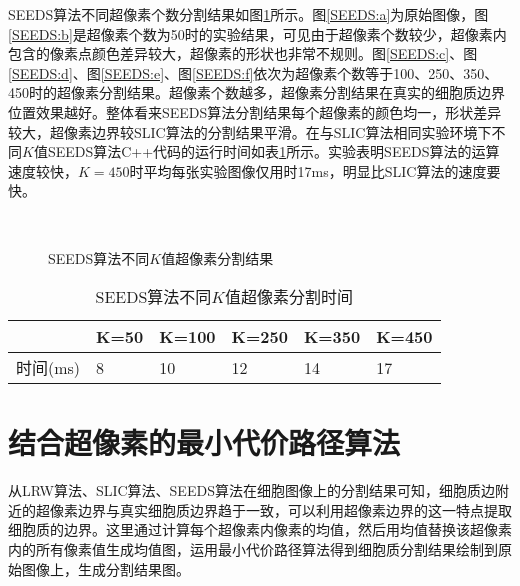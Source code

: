 \documentclass[nomlist,masters]{seuthesix}
\begin{document}
SEEDS算法不同超像素个数分割结果如图\ref{SEEDS}所示。图\ref{SEEDS:a}为原始图像，图\ref{SEEDS:b}是超像素个数为50时的实验结果，可见由于超像素个数较少，超像素内包含的像素点颜色差异较大，超像素的形状也非常不规则。图\ref{SEEDS:c}、图\ref{SEEDS:d}、图\ref{SEEDS:e}、图\ref{SEEDS:f}依次为超像素个数等于100、250、350、450时的超像素分割结果。超像素个数越多，超像素分割结果在真实的细胞质边界位置效果越好。整体看来SEEDS算法分割结果每个超像素的颜色均一，形状差异较大，超像素边界较SLIC算法的分割结果平滑。在与SLIC算法相同实验环境下不同$K$值SEEDS算法C++代码的运行时间如表\ref{SEEDStime}所示。实验表明SEEDS算法的运算速度较快，$K=450$时平均每张实验图像仅用时17ms，明显比SLIC算法的速度要快。
\begin{figure}[H]
\centering 
\hspace{0.01\textwidth}
\hspace{0.01\textwidth}
\vfill
\centering 
\hspace{0.01\textwidth}
\hspace{0.01\textwidth}
\caption{SEEDS算法不同$K$值超像素分割结果}
\label{SEEDS}
\end{figure}

\begin{table}[H]
\centering
\caption{SEEDS算法不同$K$值超像素分割时间\label{SEEDStime}}
\begin{tabular}{|p{2cm}<{\centering}|p{2cm}<{\centering}|p{2cm}<{\centering}|p{2cm}<{\centering}|p{2cm}<{\centering}|p{2cm}<{\centering}|}
\hline
 & K=50 & K=100 & K=250 & K=350 & K=450\\
\hline
时间(ms) & 8 & 10 & 12 & 14 & 17\\
\hline
\end{tabular}
\end{table}



\section{结合超像素的最小代价路径算法}
从LRW算法、SLIC算法、SEEDS算法在细胞图像上的分割结果可知，细胞质边附近的超像素边界与真实细胞质边界趋于一致，可以利用超像素边界的这一特点提取细胞质的边界。这里通过计算每个超像素内像素的均值，然后用均值替换该超像素内的所有像素值生成均值图，运用最小代价路径算法得到细胞质分割结果绘制到原始图像上，生成分割结果图。
\end{document}
